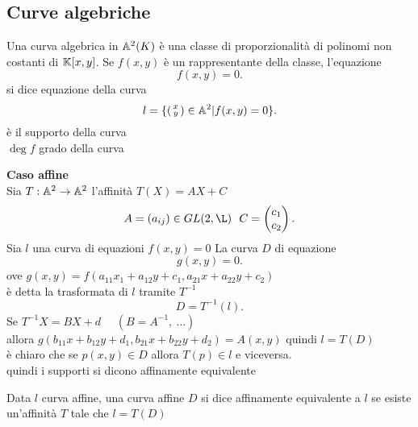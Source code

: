 \documentclass[12px]{article}
\begin{document}
\subsection{Curve algebriche}
\begin{defi}
	Una curva algebrica in $\mathbb{A}^2(K)$ è una classe di proporzionalità di polinomi non costanti di  $\mathbb{K}[x,y]$. Se  $f(x,y)$ è un rappresentante della classe, l'equazione 
	\[
	f(x,y) = 0
	.\] si dice equazione della curva
	\[
		 l= \{\left(\begin{smallmatrix}x\\y\end{smallmatrix}\right)\in \mathbb{A}^2|f(x,y) = 0\}
	.\] è il supporto della curva\\
	$\deg f$ grado della curva
\end{defi}
\textbf{Caso affine}\\
Sia $T: \mathbb{A}^2 \rightarrow \mathbb{A}^2$ l'affinità $T(X) = AX + C$
 \[
	 A = (a_{ij})\in GL(2,\L) \ \ C = \matrice{c_1\\c_2}
.\] 
Sia $l$ una curva di equazioni $f(x,y) = 0$
La curva $D$ di equazione 
\[
g(x,y) =0 
.\] 
ove $g(x,y) = f(a_{11}x_1+a_{12}y+c_1,a_{21}x+a_{22}y+c_2)$ \\
è detta la trasformata di $l$ tramite $T^{-1}$
 \[
 D = T^{-1}(l)
.\] 
Se $T^{-1}X = BX + d$ \ \ $(B = A^{-1}, \ \ldots)$\\
allora  $g(b_{11}x + b_{12}y + d_1, b_{21}x+b_{22}y + d_2) = A(x,y)$
quindi $l = T(D)$\\
è chiaro che se  $p(x,y)\in D$ allora $T(p)\in l$ e viceversa.\\
quindi i supporti si dicono affinamente equivalente
\begin{defi}
	Data $l$ curva affine, una curva affine $D$  si dice affinamente equivalente a $l$ se esiste un'affinità $T$ tale che $l = T(D)$
\end{defi}
\end{document}
